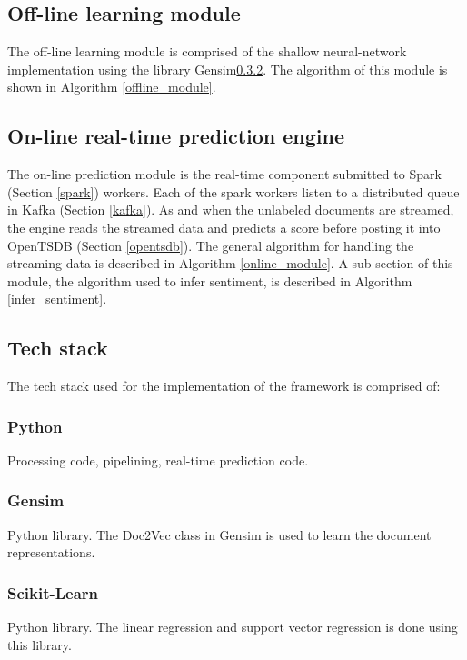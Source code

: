 \documentclass[conference]{IEEEtran}
\begin{document}
    \subsection{Off-line learning module}
        The off-line learning module is comprised of the shallow neural-network implementation using the library Gensim\ref{gensim}. The algorithm of this module is shown in Algorithm \ref{offline_module}.

    \subsection{On-line real-time prediction engine}
        The on-line prediction module is the real-time component submitted to Spark (Section \ref{spark}) workers. Each of the spark workers listen to a distributed queue in Kafka (Section \ref{kafka}). As and when the unlabeled documents are streamed, the engine reads the streamed data and predicts a score before posting it into OpenTSDB (Section \ref{opentsdb}). The general algorithm for handling the streaming data is described in Algorithm \ref{online_module}. A sub-section of this module, the algorithm used to infer sentiment, is described in Algorithm \ref{infer_sentiment}.

    \subsection{Tech stack} \label{Tech stack}
        The tech stack used for the implementation of the framework is comprised of:

        \subsubsection{Python}
            Processing code, pipelining, real-time prediction code\cite{python}.

        \subsubsection{Gensim} \label{gensim}
            Python library. The Doc2Vec class in Gensim is used to learn the document representations\cite{doc2vec_api}.
        
        \subsubsection{Scikit-Learn}
            Python library. The linear regression and support vector regression is done using this library\cite{scikit_learn}.
        
\end{document}
